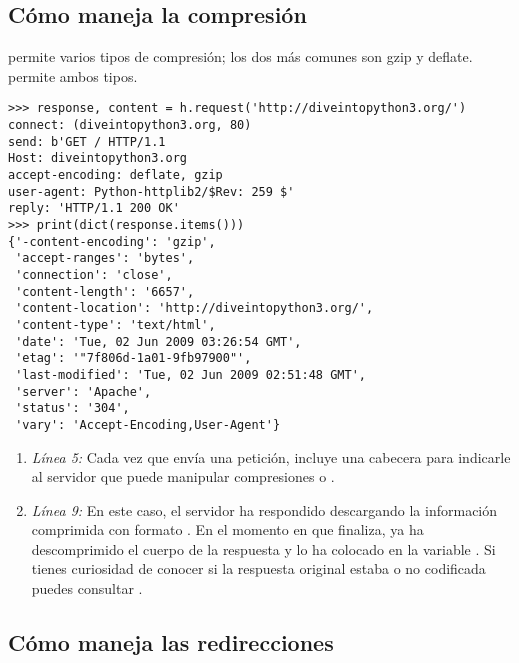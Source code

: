 \subsection{Cómo maneja la compresión }

 permite varios tipos de compresión; los dos más comunes son gzip y deflate.  permite ambos tipos.

\noindent\begin{minipage}{\textwidth}
\begin{lstlisting}[mathescape=True]
>>> response, content = h.request('http://diveintopython3.org/')
connect: (diveintopython3.org, 80)
send: b'GET / HTTP/1.1
Host: diveintopython3.org
accept-encoding: deflate, gzip 
user-agent: Python-httplib2/$Rev: 259 $'
reply: 'HTTP/1.1 200 OK'
>>> print(dict(response.items()))
{'-content-encoding': 'gzip', 
 'accept-ranges': 'bytes',
 'connection': 'close',
 'content-length': '6657',
 'content-location': 'http://diveintopython3.org/',
 'content-type': 'text/html',
 'date': 'Tue, 02 Jun 2009 03:26:54 GMT',
 'etag': '"7f806d-1a01-9fb97900"',
 'last-modified': 'Tue, 02 Jun 2009 02:51:48 GMT',
 'server': 'Apache',
 'status': '304',
 'vary': 'Accept-Encoding,User-Agent'}
\end{lstlisting}
\end{minipage}

\begin{enumerate}

\item \emph{Línea 5:} Cada vez que  envía una petición, incluye una cabecera  para indicarle al servidor que puede manipular compresiones  o .

\item \emph{Línea 9:} En este caso, el servidor ha respondido descargando la información comprimida con formato . En el momento en que  finaliza,  ya ha descomprimido el cuerpo de la respuesta y lo ha colocado en la variable . Si tienes curiosidad de conocer si la respuesta original estaba o no codificada puedes consultar . 

\end{enumerate}

\subsection{Cómo maneja las redirecciones }

